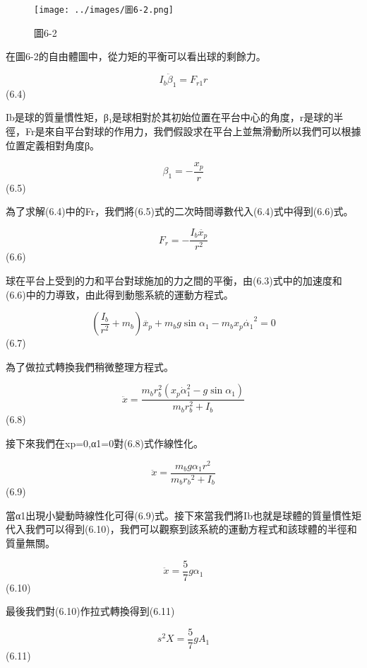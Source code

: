 \begin{figure}[h]
\centering
\texttt{[image: ../images/圖6-2.png]}
\caption{圖6-2}
\end{figure}

在圖6-2的自由體圖中，從力矩的平衡可以看出球的剩餘力。

\begin{equation}
I_b \ddot{\beta}_1=F_{r 1} r
\end{equation} 
(6.4)

Ib是球的質量慣性矩，β₁是球相對於其初始位置在平台中心的角度，r是球的半徑，Fr是來自平台對球的作用力，我們假設求在平台上並無滑動所以我們可以根據位置定義相對角度β。

\begin{equation}
\beta_1=-\frac{x_p}{r}
\end{equation} 
(6.5)

為了求解(6.4)中的Fr，我們將(6.5)式的二次時間導數代入(6.4)式中得到(6.6)式。

\begin{equation}
F_r=-\frac{I_b \ddot{x_p}}{r^2}
\end{equation} 
(6.6)

球在平台上受到的力和平台對球施加的力之間的平衡，由(6.3)式中的加速度和(6.6)中的力導致，由此得到動態系統的運動方程式。

\begin{equation}
\left(\frac{I_b}{r^2}+m_b\right) \ddot{x_p}+m_b g \sin \alpha_1-m_b x_p{\dot{\alpha_1}}^2=0
\end{equation} 
(6.7)

為了做拉式轉換我們稍微整理方程式。

\begin{equation}
\ddot{x}=\frac{m_b r_b^2\left(x_p \dot{\alpha}_1^2-g \sin \alpha_1\right)}{m_b r_b^2+I_b}
\end{equation} 
(6.8)

接下來我們在xp=0,α1=0對(6.8)式作線性化。

\begin{equation}
\ddot{x}=\frac{m_b g \alpha_1 r^2}{m_b r_b{ }^2+I_b}
\end{equation}
(6.9)

當α1出現小變動時線性化可得(6.9)式。接下來當我們將Ib也就是球體的質量慣性矩代入我們可以得到(6.10)，我們可以觀察到該系統的運動方程式和該球體的半徑和質量無關。

\begin{equation}
\ddot{x}=\frac{5}{7} g \alpha_1
\end{equation}
(6.10)

最後我們對(6.10)作拉式轉換得到(6.11)

\begin{equation}
s^2 X=\frac{5}{7} g A_1
\end{equation}
(6.11)